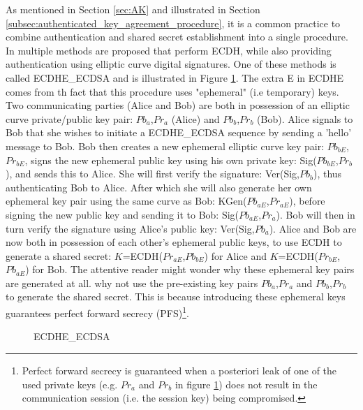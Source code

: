As mentioned in Section \ref{sec:AK} and illustrated in Section \ref{subsec:authenticated_key_agreement_procedure}, it is a common practice to combine authentication and shared secret establishment into a single procedure. In \cite{RFC4492} multiple methods are proposed that perform ECDH, while also providing authentication using elliptic curve digital signatures. One of these methods is called ECDHE\_ECDSA and is illustrated in Figure \ref{fig:ECDH2}. The extra E in ECDHE comes from th fact that this procedure uses "ephemeral" (i.e temporary) keys. Two communicating parties (Alice and Bob) are both in possession of an elliptic curve private/public key pair: $Pb_a$,$Pr_a$ (Alice) and $Pb_b$,$Pr_b$ (Bob). Alice signals to Bob that she wishes to initiate a ECDHE\_ECDSA sequence by sending a 'hello' message to Bob. Bob then creates a new ephemeral elliptic curve key pair: $Pb_{bE}$,$Pr_{bE}$, signs the new ephemeral public key using his own private key: Sig($Pb_{bE}$,$Pr_b$), and sends this to Alice. She will first verify the signature: Ver(Sig,$Pb_{b}$), thus authenticating Bob to Alice. After which she will also generate her own ephemeral key pair using the same curve as Bob: KGen($Pb_{aE}$,$Pr_{aE}$), before signing the new public key and sending it to Bob: Sig($Pb_{aE}$,$Pr_a$). Bob will then in turn verify the signature using Alice's public key: Ver(Sig,$Pb_{a}$). Alice and Bob are now both in possession of each other's ephemeral public keys, to use ECDH to generate a shared secret: $K$=ECDH($Pr_{aE}$,$Pb_{bE}$) for Alice and $K$=ECDH($Pr_{bE}$,$Pb_{aE}$) for Bob. The attentive reader might wonder why these ephemeral key pairs are generated at all. why not use the pre-existing key pairs $Pb_a$,$Pr_a$ and $Pb_b$,$Pr_b$ to generate the shared secret. This is because introducing these ephemeral keys guarantees perfect forward secrecy (PFS)\footnote{Perfect forward secrecy is guaranteed when a posteriori leak of one of the used private keys (e.g. $Pr_a$ and $Pr_b$ in figure \ref{fig:ECDH2}) does not result in the communication session (i.e. the session key) being compromised.}.


\begin{figure}[h]
	\centering
	\caption{ECDHE\_ECDSA}
	\label{fig:ECDH2}
\end{figure} 

